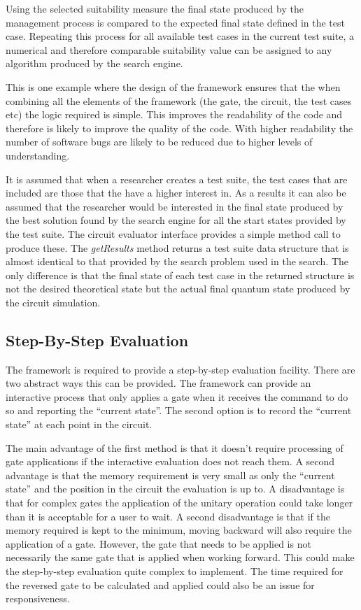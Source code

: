 Using the selected suitability measure  the final state produced by the management process is compared to the expected final state defined in the test case.
Repeating this process for all available test cases in the current test suite, a numerical and therefore comparable suitability value can be assigned to any algorithm produced by the search engine.

This is one example where the design of the framework ensures that the when combining all the elements of the framework (the gate, the circuit, the test cases etc) the logic required is simple.
This improves the readability of the code and therefore is likely to improve the quality of the code.
With higher readability the number of software bugs are likely to be reduced due to higher levels of understanding.

It is assumed that when a researcher creates a test suite, the test cases that are included are those that the have a higher interest in.
As a results it can also be assumed that the researcher would be interested in the final state produced by the best solution found by the search engine for all the start states provided by the test suite.
The circuit evaluator interface provides a simple method call to produce these.
The \emph{getResults} method returns a test suite data structure that is almost identical to that provided by the search problem used in the search.
The only difference is that the final state of each test case in the returned structure is not the desired theoretical state but the actual final quantum state produced by the circuit simulation.

\subsection{Step-By-Step Evaluation}
The framework is required to provide a step-by-step evaluation facility.
There are two abstract ways this can be provided.
The framework can provide an interactive process that only applies a gate when it receives the command to do so and reporting the ``current state''.
The second option is to record the ``current state'' at each point in the circuit.

The main advantage of the first method is that it doesn't require processing of gate applications if the interactive evaluation does not reach them.
A second advantage is that the memory requirement is very small as only the ``current state'' and the position in the circuit the evaluation is up to.
A disadvantage is that for complex gates the application of the unitary operation could take longer than it is acceptable for a user to wait.
A second disadvantage is that if the memory required is kept to the minimum, moving backward will also require the application of a gate.
However, the gate that needs to be applied is not necessarily the same gate that is applied when working forward.
This could make the step-by-step evaluation quite complex to implement.
The time required for the reversed gate to be calculated and applied could also be an issue for responsiveness.

